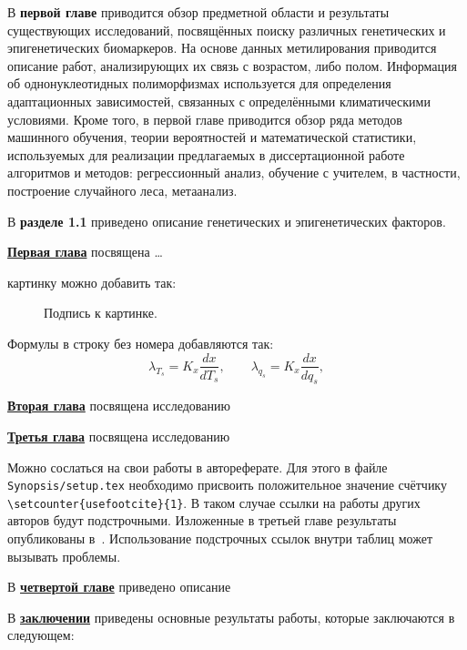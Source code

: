 В \textbf{первой главе} приводится обзор предметной области и результаты существующих исследований, посвящённых поиску различных генетических и эпигенетических биомаркеров. На основе данных метилирования приводится описание работ, анализирующих их связь с возрастом, либо полом. Информация об однонуклеотидных полиморфизмах используется для определения адаптационных зависимостей, связанных с определёнными климатическими условиями. Кроме того, в первой главе приводится обзор ряда методов машинного обучения, теории вероятностей и математической статистики, используемых для реализации предлагаемых в диссертационной работе алгоритмов и методов: регрессионный анализ, обучение с учителем, в частности, построение случайного леса, метаанализ.

В \textbf{разделе 1.1} приведено описание генетических и эпигенетических факторов. 



\underline{\textbf{Первая глава}} посвящена \dots

картинку можно добавить так:
\begin{figure}[ht]
    \caption{Подпись к картинке.}\label{fig:latex}
\end{figure}

Формулы в строку без номера добавляются так:
\[
  \lambda_{T_s} = K_x\frac{d{x}}{d{T_s}}, \qquad
  \lambda_{q_s} = K_x\frac{d{x}}{d{q_s}},
\]

\underline{\textbf{Вторая глава}} посвящена исследованию

\underline{\textbf{Третья глава}} посвящена исследованию

Можно сослаться на свои работы в автореферате. Для этого в файле
\verb!Synopsis/setup.tex! необходимо присвоить положительное значение
счётчику \verb!\setcounter{usefootcite}{1}!. В таком случае ссылки на
работы других авторов будут подстрочными.
Изложенные в третьей главе результаты опубликованы в~\cite{vakbib1, vakbib2}.
Использование подстрочных ссылок внутри таблиц может вызывать проблемы.

В \underline{\textbf{четвертой главе}} приведено описание

\FloatBarrier
{}                                  %
В \underline{\textbf{заключении}} приведены основные результаты работы, которые заключаются в следующем:


